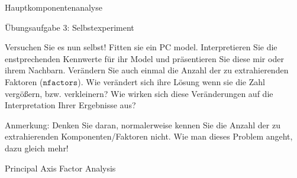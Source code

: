 \documentclass[
  ignorenonframetext,
]{beamer}
\newenvironment{Shaded}{\begin{snugshade}}{\end{snugshade}}
\newcommand{\AttributeTok}[1]{\textcolor[rgb]{0.77,0.63,0.00}{#1}}
\newcommand{\CommentTok}[1]{\textcolor[rgb]{0.56,0.35,0.01}{\textit{#1}}}
\newcommand{\ConstantTok}[1]{\textcolor[rgb]{0.00,0.00,0.00}{#1}}
\newcommand{\DecValTok}[1]{\textcolor[rgb]{0.00,0.00,0.81}{#1}}
\newcommand{\DocumentationTok}[1]{\textcolor[rgb]{0.56,0.35,0.01}{\textbf{\textit{#1}}}}
\newcommand{\FunctionTok}[1]{\textcolor[rgb]{0.00,0.00,0.00}{#1}}
\newcommand{\NormalTok}[1]{#1}
\newcommand{\OtherTok}[1]{\textcolor[rgb]{0.56,0.35,0.01}{#1}}
\newcommand{\SpecialCharTok}[1]{\textcolor[rgb]{0.00,0.00,0.00}{#1}}
\newcommand{\StringTok}[1]{\textcolor[rgb]{0.31,0.60,0.02}{#1}}
\begin{document}
\begin{frame}[fragile]{Hauptkomponentenanalyse}
\protect\hypertarget{hauptkomponentenanalyse}{}
\begin{Shaded}
\end{Shaded}
\end{frame}

\begin{frame}{Übungsaufgabe 3: Selbstexperiment}
\protect\hypertarget{uxfcbungsaufgabe-3-selbstexperiment}{}
\begin{example}
Versuchen Sie es nun selbst! Fitten sie ein PC model. Interpretieren Sie die
enstprechenden Kennwerte für ihr Model und präsentieren Sie diese mir oder ihrem
Nachbarn. Verändern Sie auch einmal die Anzahl der zu extrahierenden Faktoren
($\texttt{nfactors}$). Wie verändert sich ihre Lösung wenn sie die Zahl
vergößern, bzw. verkleinern? Wie wirken sich diese Veränderungen auf die
Interpretation Ihrer Ergebnisse aus? 
\end{example}

Anmerkung: Denken Sie daran, normalerweise kennen Sie die Anzahl der zu
extrahierenden Komponenten/Faktoren nicht. Wie man dieses Problem
angeht, dazu gleich mehr!
\end{frame}

\begin{frame}[fragile]{Principal Axis Factor Analysis}
\protect\hypertarget{principal-axis-factor-analysis}{}
\begin{Shaded}
\end{Shaded}
\end{frame}
\end{document}
